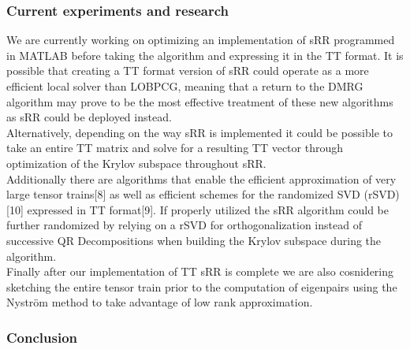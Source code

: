 \documentclass[%
 aip,12pt
 amsmath,amssymb,
 reprint,%
]{revtex4-1}
\begin{document}
\subsubsection{\label{sec:level3} Current experiments and research }
We are currently working on optimizing an implementation of sRR programmed in MATLAB before taking the algorithm and expressing it in the TT format. It is possible that creating a TT format version of sRR could operate as a more efficient local solver than LOBPCG, meaning that a return to the DMRG algorithm may prove to be the most effective treatment of these new algorithms as sRR could be deployed instead. \\
Alternatively, depending on the way sRR is implemented it could be possible to take an entire TT matrix and solve for a resulting TT vector through optimization of the Krylov subspace throughout sRR.\\
Additionally there are algorithms that enable the efficient approximation of very large tensor trains[8] as well as efficient schemes for the randomized SVD (rSVD) [10] expressed in TT format[9]. If properly utilized the sRR algorithm could be further randomized by relying on a rSVD for orthogonalization instead of successive QR Decompositions when building the Krylov subspace during the algorithm. \\
Finally after our implementation of TT sRR is complete we are also cosnidering sketching the entire tensor train prior to the computation of eigenpairs using the Nyström method to take advantage of low rank approximation.\\


\subsubsection{\label{sec:level3} Conclusion}
\end{document}
